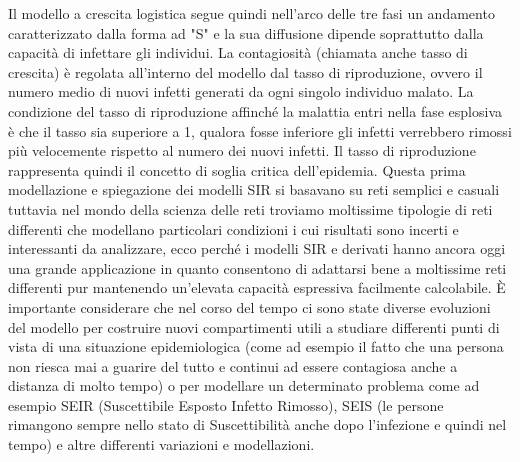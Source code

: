 Il modello a crescita logistica segue quindi nell'arco delle tre fasi un andamento caratterizzato dalla forma ad "S" e la sua diffusione dipende soprattutto dalla capacità di infettare gli individui. La contagiosità (chiamata anche tasso di crescita) è regolata all'interno del modello dal tasso di riproduzione, ovvero il numero medio di nuovi infetti generati da ogni singolo individuo malato.
La condizione del tasso di riproduzione affinché la malattia entri nella fase esplosiva è che il tasso sia superiore a 1, qualora fosse inferiore gli infetti verrebbero rimossi più velocemente rispetto al numero dei nuovi infetti. Il tasso di riproduzione rappresenta quindi il concetto di soglia critica dell'epidemia.
Questa prima modellazione e spiegazione dei modelli SIR si basavano su reti semplici e casuali tuttavia nel mondo della scienza delle reti troviamo moltissime tipologie di reti differenti che modellano particolari condizioni i cui risultati sono incerti e interessanti da analizzare, ecco perché i modelli SIR e derivati hanno ancora oggi una grande applicazione in quanto consentono di adattarsi bene a moltissime reti differenti pur mantenendo un'elevata capacità espressiva facilmente calcolabile.
È importante considerare che nel corso del tempo ci sono state diverse evoluzioni del modello per costruire nuovi compartimenti utili a studiare differenti punti di vista di una situazione epidemiologica (come ad esempio il fatto che una persona non riesca mai a guarire del tutto e continui ad essere contagiosa anche a distanza di molto tempo) o per modellare un determinato problema come ad esempio SEIR (Suscettibile Esposto Infetto Rimosso), SEIS (le persone rimangono sempre nello stato di Suscettibilità anche dopo l'infezione e quindi nel tempo) e altre differenti variazioni e modellazioni.